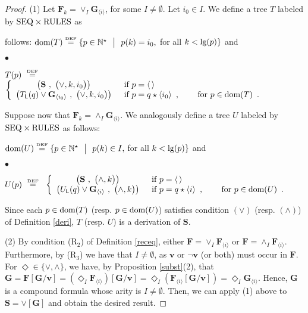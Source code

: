 \documentclass[copyright,creativecommons]{eptcs}
\newcommand{\vv}{\langle}
\newcommand{\ww}{\rangle}
\newcommand{\NN}{\mathbb{N}}
\newcommand{\eqdef}{\stackrel{\text{\tiny \textnormal{DEF}}}{=}}
\newcommand{\st}{ \ \ \big{|} \ \ }
\newcommand{\roo}{\vv \, \ww}
\newcommand{\Dis}[1]{\big( #1 \big)}
\newcommand{\bF}{\mathbf{F}}
\newcommand{\bG}{\mathbf{G}}
\newcommand{\bS}{\mathbf{S}}
\newcommand{\bbv}{\mathbf{v}}
\newcommand{\len}{\textnormal{lg}}
\newcommand{\dom}{\ensuremath{\textnormal{dom}}}
\newcommand{\seq}{\textnormal{SEQ}}
\newcommand{\rules}{\textnormal{RULES}}
\newcommand{\sL}{\mathsf{L}}
\theoremstyle{definition}
\newcommand{\squishlist}{
 \begin{list}{$\bullet$}
  { \setlength{\itemsep}{0pt}
     \setlength{\parsep}{3pt}
     \setlength{\topsep}{3pt}
     \setlength{\partopsep}{0pt}
     \setlength{\leftmargin}{1em}
     \setlength{\labelwidth}{1.5em}
     \setlength{\labelsep}{0.5em} } }
\newcommand{\squishend}{
  \end{list}  }
\begin{document}
 \begin{proof} (1)
Let $\bF_k = \vee_I \bG_{\vv i \ww}$, for some
$I \neq\emptyset$. Let
$ i_0\in I$. We define a tree $T$ labeled by
$\seq \times \rules$ as \linebreak

\vspace{-0.45cm}
\noindent follows:
$\dom(T) \eqdef \{ p \in \NN^\star \st p(k)= i_0, $ for all $k <\len(p) \}$ and



\squishlist
\item[] {\centering
${T}(p) \ \eqdef \ $ $\left\{
  \begin{array}{cl}
   \big( \bS \ , \ \Dis{\vee, k , i_0} \big)\enspace&   \hbox{if $p = \roo$} \\
   \big(    T_\sL(q) \vee  \bG_{\vv i_0\ww} \ , \ \Dis{\vee, k , i_0} \big)\enspace &  \hbox{if $p = q \star \vv i_0\ww$\enspace, \qquad for  $ p \in \dom(T)$\enspace.}    \end{array}
\right.$ \par}
\squishend
\noindent
Suppose now that $\bF_k = \wedge_I \bG_{\vv i \ww}$.  We analogously define a tree $U$ labeled by
$\seq \times \rules$ as follows: \linebreak

 \vspace{-0.45cm}
\noindent
$\dom(U) \eqdef \{ p \in \NN^\star \st p(k) \in I, $ for all $k <\len(p)\}$ and


\squishlist
\item[] {\centering
${U}(p) \ \eqdef \ $ $\left\{
  \begin{array}{cl}
   \big(  \bS \ , \ \Dis{\wedge, k} \big)\enspace&   \hbox{if $p = \roo$} \\
   \big(    U_\sL(q) \vee  \bG_{\vv i \ww} \ , \ \Dis{\wedge, k}  \big)\enspace &  \hbox{if $p = q \star \vv i \ww$\enspace, \qquad for  $ p \in \dom(U)$\enspace.}    \end{array}
\right.$ \par}
\squishend
Since each $p \in \dom(T)$ (resp. $p \in \dom(U)$)
satisfies condition
 $(\vee)$ (resp. $(\wedge)$) of Definition \ref{deri},
$T$  (resp. $U$)   is a derivation of $ \bS$.


(2) By condition (R$_2$) of Definition \ref{receq}, either $\bF = \vee_I \bF_{\vv i \ww}$ or $\bF = \wedge_I \bF_{\vv i \ww}$. Furthermore, by
 (R$_3$) we have that
$I \neq\emptyset$, as $\bbv$ or $\neg\bbv$ (or both)
must occur in $\bF$.
For $\Diamond \in \{\vee, \wedge\}$,  we have, by  Proposition \ref{subst}(2), that
  $ \bG =  \bF[\bG/\bbv] = (\Diamond_I \bF_{\vv i \ww})[\bG/\bbv] = \Diamond_{I}(\bF_{\vv i \ww}[\bG/\bbv]) = \Diamond_I \bG_{\vv i \ww}$. Hence, $\bG$ is a compound formula whose arity is $I \neq \emptyset$.
Then, we can apply (1) above to $\bS = \vee[\bG]$
and obtain the desired result.
     \end{proof}
\end{document}
